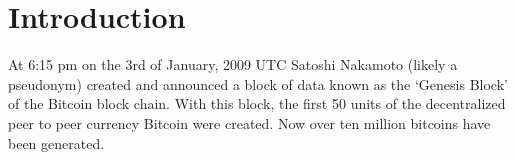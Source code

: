 \section{Introduction}
%
%



% 
% 
% 
% 

At 6:15 pm on the 3rd of January, 2009 UTC Satoshi Nakamoto (likely a pseudonym)
created and announced a block of data known as the `Genesis Block' of the Bitcoin
block chain\cite{satoshi}. With this block, the first 50 units of the
decentralized peer to peer currency Bitcoin were created.  Now over ten million
bitcoins have been generated.

